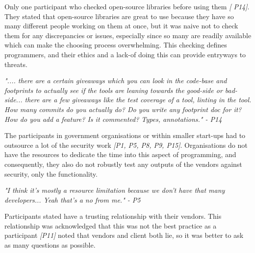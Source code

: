 \newline
\par
Only one participant who checked open-source libraries before using them \textit{[ P14]}. They stated that open-source libraries are great to use because they have so many different people working on them at once, but it was naive not to check them for any discrepancies or issues, especially since so many are readily available which can make the choosing process overwhelming. This checking defines programmers, and their ethics and a lack-of doing this can provide entryways to threats.
\newline
\par
\textit{".... there are a certain giveaways which you can look in  the code-base and footprints to actually see if the tools are leaning towards the good-side or bad-side... there are a few giveaways like the test coverage of a tool, linting in the tool. How many commits do you actually do? Do you write any footprint doc for it? How do you add a feature? Is it commented? Types, annotations." - P14}
\newline
\par 
The participants in government organisations or within smaller start-ups had to outsource a lot of the security work \textit{[P1, P5, P8, P9, P15]}. Organisations do not have the resources to dedicate the time into this aspect of programming, and consequently, they also do not robustly test any outputs of the vendors against security, only the functionality. 
\newline
\par 
\textit{"I think it's mostly a resource limitation because we don't have that many developers... Yeah that's a no from me." - P5}
\newline
\par
Participants stated have a trusting relationship with their vendors. This relationship was acknowledged that this was not the best practice as a participant \textit{[P11]} noted that vendors and client both lie, so it was better to ask as many questions as possible. 
\newline
\par 
